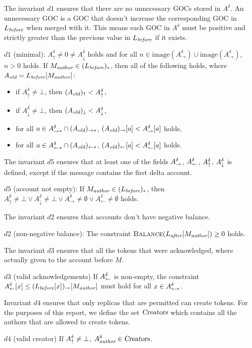 \documentclass{article}
\begin{document}
The invariant $d1$ ensures that there are no unnecessary GOCs stored in $A^\delta$. An unnecessary GOC is a GOC that doesn't increase the corresponding GOC in $L_\emph{before}$ when merged with it. This means each GOC in $A^\delta$ must be positive and strictly greater than the previous value in $L_\emph{before}$ if it exists.
\begin{invariant}{$d1$}
    (minimal):
    $A^\delta_\uparrow \neq 0 \neq A^\delta_\downarrow$ holds and for all $n \in \text{image}(A^\delta_\rightarrow)\cup \text{image}(A^\delta_\rightarrow)$, $n > 0$ holds.
    If $M_\emph{author} \in (L_\emph{before})_*$, then all of the following holds, where $A_\emph{old} = L_\emph{before}[M_\emph{author}]$:
    \begin{itemize}
        \item if $A^\delta_\uparrow \neq \bot$, then $(A_\emph{old})_\uparrow < A^\delta_\uparrow$,
        \item if $A^\delta_\downarrow \neq \bot$, then $(A_\emph{old})_\downarrow < A^\delta_\downarrow$,
        \item for all $a \in A^\delta_{\rightarrow*} \cap (A_\emph{old})_{\rightarrow*}$, $(A_\emph{old})_{\rightarrow}[a] < A^\delta_{\rightarrow}[a]$ holds,
        \item for all $a \in A^\delta_{\leftarrow*} \cap (A_\emph{old})_{\leftarrow*}$, $(A_\emph{old})_{\leftarrow}[a] < A^\delta_{\leftarrow}[a]$ holds.
    \end{itemize}
\end{invariant}
The invariant $d5$ ensures that at least one of the fields $A^\delta_\rightarrow$, $A^\delta_\leftarrow$, $A^\delta_\uparrow$, $A^\delta_\downarrow$ is defined, except if the message contains the first delta account.
\begin{invariant}{$d5$}
    (account not empty): If $M_\emph{author} \in (L_\emph{before})_*$, then
    $A^\delta_\uparrow \neq \bot \lor A^\delta_\downarrow \neq \bot \lor A^\delta_\rightarrow \neq \emptyset \lor A^\delta_\leftarrow \neq \emptyset$ holds.
\end{invariant}
The invariant $d2$ ensures that accounts don't have negative balance.
\begin{invariant}{$d2$}
    (non-negative balance): The constraint $\textsc{Balance}(L_\textit{after}[M_\emph{author}]) \ge 0$ holds.
\end{invariant}
The invariant $d3$ ensures that all the tokens that were acknowledged, where actually given to the account before $M$.
\begin{invariant}{$d3$}
    (valid acknowledgements) If $A^\delta_\leftarrow$ is non-empty, the constraint $A^\delta_\leftarrow[x] \le (L_\textit{before}[x])_\rightarrow[M_\emph{author}]$ must hold for all $x \in A^\delta_{\leftarrow*}$.
\end{invariant}
Invariant $d4$ ensures that only replicas that are permitted can create tokens. For the purposes of this report, we define the set $\textsl{Creators}$ which contains all the authors that are allowed to create tokens.
\begin{invariant}{$d4$}
    (valid creator) If $A^\delta_\uparrow \neq \bot$, $A^\delta_\emph{author} \in \textsl{Creators}$.
\end{invariant}
\end{document}

